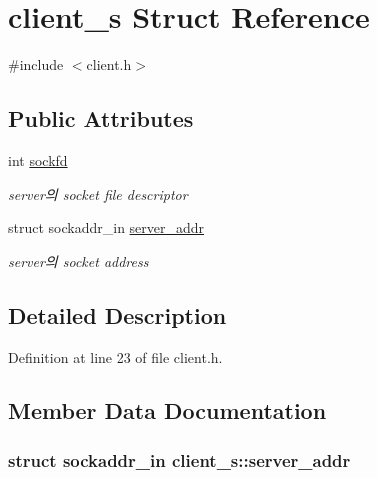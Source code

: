 \hypertarget{structclient__s}{\section{client\-\_\-s Struct Reference}
\label{structclient__s}
}


{\ttfamily \#include $<$client.\-h$>$}

\subsection*{Public Attributes}
\begin{DoxyCompactItemize}
\item 
int \hyperlink{structclient__s_a409a70b3071eaf5be18d0439d256756a}{sockfd}
\begin{DoxyCompactList}\small\item\em server의 socket file descriptor \end{DoxyCompactList}\item 
struct sockaddr\-\_\-in \hyperlink{structclient__s_a4cb8f28435762b205424d16ea39dcab3}{server\-\_\-addr}
\begin{DoxyCompactList}\small\item\em server의 socket address \end{DoxyCompactList}\end{DoxyCompactItemize}


\subsection{Detailed Description}


Definition at line 23 of file client.\-h.



\subsection{Member Data Documentation}
\hypertarget{structclient__s_a4cb8f28435762b205424d16ea39dcab3}{
\subsubsection[{server\-\_\-addr}]{\setlength{\rightskip}{0pt plus 5cm}struct sockaddr\-\_\-in client\-\_\-s\-::server\-\_\-addr}}\label{structclient__s_a4cb8f28435762b205424d16ea39dcab3}


